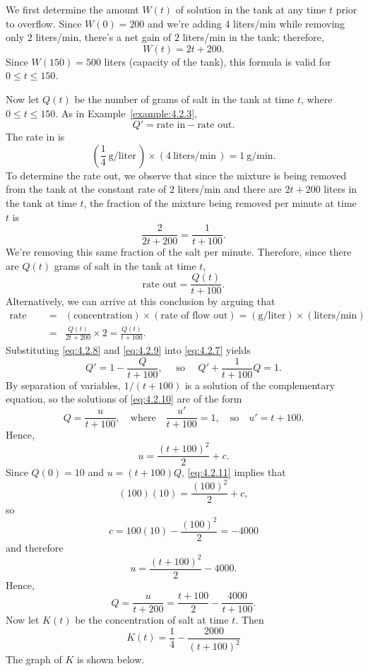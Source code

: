 \documentclass{ximera}
\begin{document}
\begin{example}
We first determine the
amount $W(t)$ of solution in the tank at any time $t$ prior to
overflow.  Since $W(0) = 200$ and we're adding $4$ liters/min while
 removing only $2$ liters/min, there's a net gain
of $2$ liters/min in the tank;  therefore,
$$
W(t) = 2t+200.
$$
 Since $W(150)=500$ liters (capacity of the
tank), this formula is valid for $0 \leq t \leq 150$.

Now let $Q(t)$ be the number of grams of salt in the tank
at time $t$, where  $0 \leq t \leq 150$.  As in Example~\ref{example:4.2.3},
\begin{equation} \label{eq:4.2.7}
Q' = \mbox{rate in}-\mbox{rate out}.
\end{equation}
 The rate in is
\begin{equation} \label{eq:4.2.8}
\left(\frac{1}{4}\  \mbox{g/liter}\,\right) \times (4\
\mbox{liters/min}\,) = 1\  \mbox{g/min}.
\end{equation}
 To determine the rate out, we observe that since
the mixture is being removed from the tank at the constant
rate of $2$ liters/min and there are $2t+200$
liters in the tank at time $t$, the fraction of the mixture
being removed per minute at time $t$ is
$$
\frac{2}{2t+200} = \frac{1}{t+100}.
$$
We're removing this same fraction of the salt per
minute.  Therefore, since there are $Q(t)$ grams of salt in
the tank at time $t$,
\begin{equation} \label{eq:4.2.9}
\mbox{rate out} = \frac{Q(t)}{t+100}.
\end{equation}
Alternatively, we can arrive at this conclusion by arguing that
$$
\begin{array}{lcl}
\mbox{rate out} & = & (\mbox{concentration})\times(\mbox{rate of
flow out})
=(\mbox{g/liter})\times(\mbox{liters/min})\\
&=&\frac{Q(t)}{2t+200}\times
2=\frac{Q(t)}{t+100}.
\end{array}
$$
 Substituting \eqref{eq:4.2.8} and \eqref{eq:4.2.9} into \eqref{eq:4.2.7}
yields
\begin{equation} \label{eq:4.2.10}
Q'=1-\frac{Q}{t+100},\quad\text{ so }\quad
Q'+\frac{1}{t+100} Q=1.
\end{equation}
By separation of variables, $1/(t+100)$ is a solution of the
complementary equation, so the solutions of \eqref{eq:4.2.10}
are of the form
$$
Q=\frac{u}{t+100},\quad\mbox{where}\quad\frac{u'}{t+100}=1,\quad\mbox{so}\quad u'=t+100.
$$
Hence,
\begin{equation} \label{eq:4.2.11}
u = \frac{(t+100)^2}{2}+c.
\end{equation}
Since $Q(0)=10$  and $u=(t+100)Q$, \eqref{eq:4.2.11} implies that
$$
(100)(10) = \frac{(100)^2}{2}+c,
$$
so
$$
c=100(10)-\frac{(100)^2}{2} =-4000
$$
and therefore
$$
u = \frac{(t+100)^2}{2} -4000.
$$
 Hence,
 $$
Q = \frac{u}{t+200}= \frac{t+100}{2}-\frac{4000}{t+100}.
$$
Now let $K(t)$ be the concentration of salt at
time $t$.  Then
$$
K(t) = \frac{1}{4}-\frac{2000}{(t+100)^2}
$$
The graph of $K$ is shown below.


\end{example}
\end{document}
